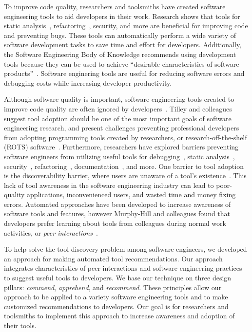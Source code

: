 \documentclass[sigconf,review,anonymous]{acmart}
\begin{document}
To improve code quality, researchers and toolsmiths have created software engineering tools to aid developers in their work. Research shows that tools for static analysis~\cite{UsingStaticAnalysis}, refactoring~\cite{Murphy-HillFitness}, security, and more are beneficial for improving code and preventing bugs. These tools can automatically perform a wide variety of software development tasks to save time and effort for developers. Additionally, the Software Engineering Body of Knowledge recommends using development tools because they can be used to achieve ``desirable characteristics of software products''~\cite{SWEBOK}. Software enginering tools are useful for reducing software errors and debugging costs while increasing developer productivity.

Although software quality is important, software engineering tools created to improve code quality are often ignored by developers~\cite{Ivanov2017Gaps}. Tilley and colleagues suggest tool adoption should be one of the most important goals of software engineering research, and present challenges preventing professional developers from adopting programming tools created by researchers, or research-off-the-shelf (ROTS) software~\cite{Tilley2003ROTS}. Furthermore, researchers have explored barriers preventing software engineers from utilizing useful tools for debugging~\cite{Cao2010Debugging}, static analysis~\cite{Johnson2013Why}, security~\cite{Xiao2014Security}, refactoring~\cite{Murphy-HillBarriersRefactoring}, documentation~\cite{Forward2002Documentation}, and more. One barrier to tool adoption is the discoverability barrier, where users are unaware of a tool's existence~\cite{Murphy-HillScreencastingDiscovery}. This lack of tool awareness in the software engineering industry can lead to poor-quality applications, inconvenienced users, and wasted time and money fixing errors. Automated approaches have been developed to increase awareness of software tools and features, however Murphy-Hill and colleagues found that developers prefer learning about tools from colleagues during normal work activities, or \textit{peer interactions}~\cite{Murphy-Hill2011PeerInteraction}.

To help solve the tool discovery problem among software engineers, we developed an approach for making automated tool recommendations. Our approach integrates characteristics of peer interactions and software engineering practices to suggest useful tools to developers. We base our technique on three design pillars: \textit{commend}, \textit{apprehend}, and \textit{recommend}. These principles allow our approach to be applied to a variety software engineering tools and to make customized recommendations to developers. Our goal is for researchers and toolsmiths to implement this approach to increase awareness and adoption of their tools.
\end{document}
